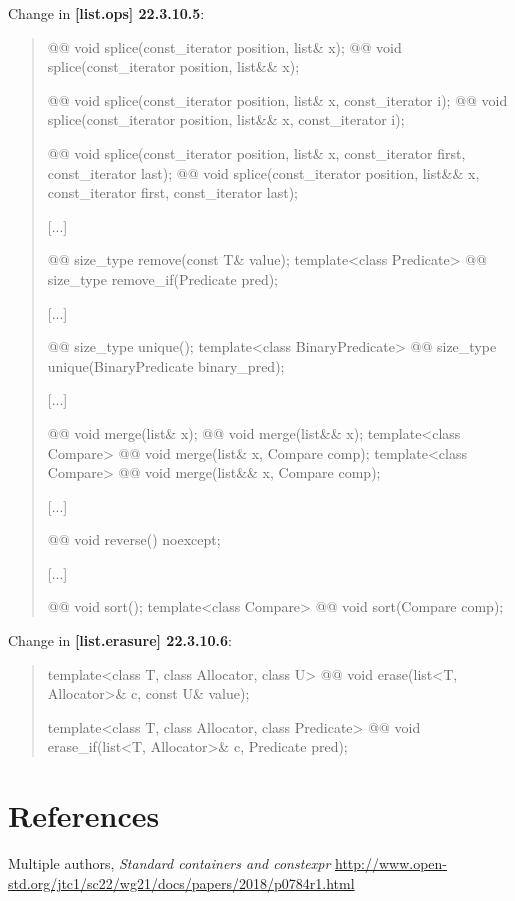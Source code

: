 \documentclass{wg21}
\begin{document}
Change in \textbf{[list.ops] 22.3.10.5}:
\begin{quote}
\begin{itemdecl}
@@ void splice(const_iterator position, list& x);
@@ void splice(const_iterator position, list&& x);

@@ void splice(const_iterator position, list& x, const_iterator i);
@@ void splice(const_iterator position, list&& x, const_iterator i);

@@ void splice(const_iterator position, list& x, const_iterator first,
const_iterator last);
@@ void splice(const_iterator position, list&& x, const_iterator first,
const_iterator last);
\end{itemdecl}
[...]
\begin{itemdecl}
@@ size_type remove(const T& value);
template<class Predicate> @@ size_type remove_if(Predicate pred);
\end{itemdecl}
[...]
\begin{itemdecl}
@@ size_type unique();
template<class BinaryPredicate> @@ size_type unique(BinaryPredicate binary_pred);
\end{itemdecl}
[...]
\begin{itemdecl}
@@ void merge(list& x);
@@ void merge(list&& x);
template<class Compare> @@ void merge(list& x, Compare comp);
template<class Compare> @@ void merge(list&& x, Compare comp);
\end{itemdecl}
[...]
\begin{itemdecl}
@@ void reverse() noexcept;
\end{itemdecl}
[...]
\begin{itemdecl}
@@ void sort();
template<class Compare> @@ void sort(Compare comp);
\end{itemdecl}
\end{quote}

Change in \textbf{[list.erasure] 22.3.10.6}:
\begin{quote}
\begin{itemdecl}
template<class T, class Allocator, class U>
  @@ void erase(list<T, Allocator>& c, const U& value);
  
template<class T, class Allocator, class Predicate>
  @@ void erase_if(list<T, Allocator>& c, Predicate pred);  
\end{itemdecl}
\end{quote}


\section{References}
\renewcommand{\section}[2]{}%
\begin{thebibliography}{9}

  Multiple authors,
  \emph{Standard containers and constexpr}\newline
  \url{http://www.open-std.org/jtc1/sc22/wg21/docs/papers/2018/p0784r1.html}

\end{thebibliography}
\end{document}
